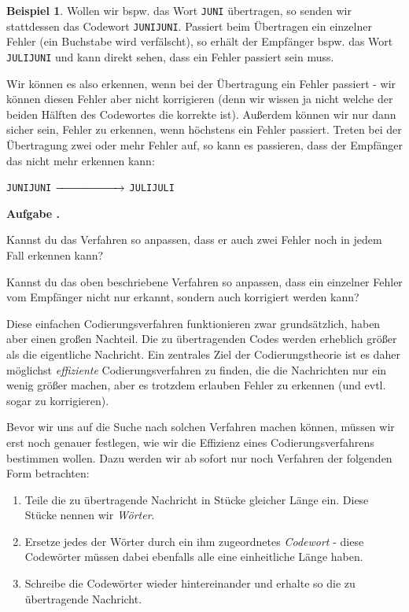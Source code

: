 \documentclass[a4paper,ngerman,12pt]{scrartcl}
\newcommand{\red}[1]{{\color{red}#1}}
\theoremstyle{definition}
\newtheorem{bsp}[defn]{Beispiel}
\theoremstyle{plain}
\theoremstyle{remark}
\newlength{\aufgabenskip}
\newcounter{aufgabennummer}
\newenvironment{aufgabe}[1]{
	\addtocounter{aufgabennummer}{1}
	\textbf{Aufgabe \theaufgabennummer.} \emph{#1} \par
}{\vspace{\aufgabenskip}}
\begin{document}
\begin{bsp}	
	Wollen wir bspw. das Wort \texttt{JUNI} übertragen, so senden wir stattdessen das Codewort \texttt{JUNIJUNI}. Passiert beim Übertragen ein einzelner Fehler (ein Buchstabe wird verfälscht), so erhält der Empfänger bspw. das Wort \texttt{JU\red{L}IJUNI} und kann direkt sehen, dass ein Fehler passiert sein muss.
\end{bsp}

Wir können es also erkennen, wenn bei der Übertragung ein Fehler passiert - wir können diesen Fehler aber nicht korrigieren (denn wir wissen ja nicht welche der beiden Hälften des Codewortes die korrekte ist). Außerdem können wir nur dann sicher sein, Fehler zu erkennen, wenn höchstens ein Fehler passiert. Treten bei der Übertragung zwei oder mehr Fehler auf, so kann es passieren, dass der Empfänger das nicht mehr erkennen kann:
	\begin{center}
		\texttt{JUNIJUNI} $\xrightarrow{\hspace*{2cm}}$ \texttt{JU\red{L}IJU\red{L}I}
	\end{center}

\begin{aufgabe}{}\label{aufgabe:verdreifachungsCodierung}
	Kannst du das Verfahren so anpassen, dass er auch zwei Fehler noch in jedem Fall erkennen kann?
	
	Kannst du das oben beschriebene Verfahren so anpassen, dass ein einzelner Fehler vom Empfänger nicht nur erkannt, sondern auch korrigiert werden kann?
\end{aufgabe}

Diese einfachen Codierungsverfahren funktionieren zwar grundsätzlich, haben aber einen großen Nachteil. Die zu übertragenden Codes werden erheblich größer als die eigentliche Nachricht. Ein zentrales Ziel der Codierungstheorie ist es daher möglichst \emph{effiziente} Codierungsverfahren zu finden, die die Nachrichten nur ein wenig größer machen, aber es trotzdem erlauben Fehler zu erkennen (und evtl. sogar zu korrigieren).

Bevor wir uns auf die Suche nach solchen Verfahren machen können, müssen wir erst noch genauer festlegen, wie wir die Effizienz eines Codierungsverfahrens bestimmen wollen. Dazu werden wir ab sofort nur noch Verfahren der folgenden Form betrachten: 
\begin{enumerate}
	\item Teile die zu übertragende Nachricht in Stücke gleicher Länge ein. Diese Stücke nennen wir \emph{Wörter}. 
	\item Ersetze jedes der Wörter durch ein ihm zugeordnetes \emph{Codewort} - diese Codewörter müssen dabei ebenfalls alle eine einheitliche Länge haben.
	\item Schreibe die Codewörter wieder hintereinander und erhalte so die zu übertragende Nachricht.
\end{enumerate}
\end{document}
